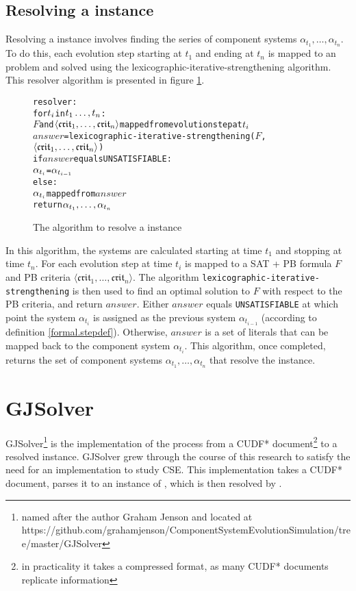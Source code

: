 \subsection{Resolving a \modelname instance}
Resolving a \modelname instance involves finding the series of component systems $\alpha_{t_1},\ldots,\alpha_{t_n}$.
To do this, each evolution step starting at $t_1$ and ending at $t_n$ is mapped to an \modelimpl problem and solved using the lexicographic-iterative-strengthening algorithm.
This resolver algorithm is presented in figure \ref{impl.resolver}.
\begin{figure}[h!t!]
\begin{center}
\begin{alltt}
resolver:  
    for \(t\sb{i}\) in \(t\sb{1}\ldots,t\sb{n}\):
        \(F\) and \(\langle{}\mathfrak{crit}\sb{1}, \ldots ,\mathfrak{crit}\sb{n}\rangle\) mapped from evolution step at \(t\sb{i}\)
        \(answer\) = lexicographic-iterative-strengthening(\(F\),\(\langle{}\mathfrak{crit}\sb{1}, \ldots ,\mathfrak{crit}\sb{n}\rangle\))
        if \(answer\) equals UNSATISFIABLE:
            \(\alpha\sb{t\sb{i}}\) = \(\alpha\sb{t\sb{i-1}}\)
        else:
            \(\alpha\sb{t\sb{i}}\) mapped from \(answer\)
    return \(\alpha\sb{t\sb{1}},\ldots,\alpha\sb{t\sb{n}}\) 
\end{alltt}
  \caption{The algorithm to resolve a \modelname instance}
  \label{impl.resolver}
\end{center}
\end{figure}

In this algorithm, the systems are calculated starting at time $t_1$ and stopping at time $t_n$.
For each evolution step at time $t_i$ is mapped to a SAT + PB formula $F$ and PB criteria $\langle \mathfrak{crit}_{1}, \ldots ,\mathfrak{crit}_{n} \rangle$.
The algorithm \texttt{lexicographic-iterative-strengthening} is then used to find an optimal solution to $F$ with respect to the PB criteria, and return $answer$.
Either $answer$ equals \texttt{UNSATISFIABLE} at which point the system $\alpha_{t_i}$ is assigned as the previous system $\alpha_{t_{i-1}}$ (according to definition \ref{formal.stepdef}).
Otherwise, $answer$ is a set of literals that can be mapped back to the component system $\alpha_{t_i}$.
This algorithm, once completed, returns the set of component systems $\alpha_{t_1},\ldots,\alpha_{t_n}$ that resolve the \modelname instance.

\section{GJSolver}
\label{impl.gjsolver}
GJSolver\footnote{\raggedright{named after the author Graham Jenson and located at} https://github.com/grahamjenson/ComponentSystemEvolutionSimulation/tree/master/GJSolver} 
is the implementation of the process from a CUDF* document\footnote{in practicality it takes a compressed format, as many CUDF* documents replicate information} to a resolved \modelname instance.
GJSolver grew through the course of this research to satisfy the need for an implementation to study CSE.
This implementation takes a CUDF* document, parses it to an instance of \modelname, which is then resolved by \modelimpl.

